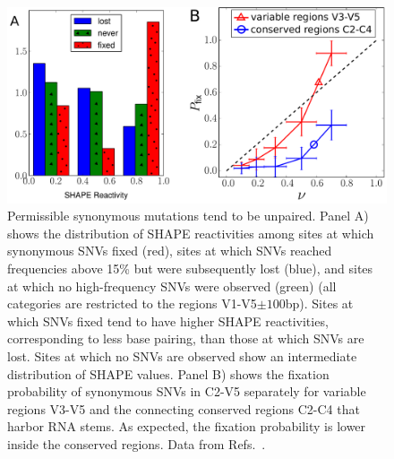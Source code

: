 \documentclass[11pt]{article}
\newcommand{\shankaregion}{C2-V5}
\begin{document}
\begin{figure}
\begin{center}
\includegraphics[width=0.9\linewidth]{fig3}
\caption{Permissible synonymous mutations tend to be unpaired.
Panel A) shows the distribution of SHAPE reactivities among sites at which synonymous 
SNVs fixed (red), sites at which SNVs reached frequencies above 15\% but
were subsequently lost (blue), and sites at which no high-frequency SNVs were observed (green) 
(all categories are restricted to the regions V1-V5$\pm 100$bp).
Sites at which SNVs fixed tend to have higher SHAPE reactivities, corresponding to
less base pairing, than those at which SNVs are lost.
Sites at which no SNVs are observed show an intermediate distribution of SHAPE values.
Panel B) shows the fixation probability of synonymous SNVs in
\shankaregion{} separately for variable regions V3-V5 and the connecting conserved 
regions C2-C4 that harbor RNA stems. As expected, the fixation probability is lower
inside the conserved regions. Data from Refs.~\cite{shankarappa_consistent_1999,
bunnik_autologous_2008, liu_selection_2006}.}
\label{fig:SHAPE}
\end{center}
\end{figure}
\end{document}
